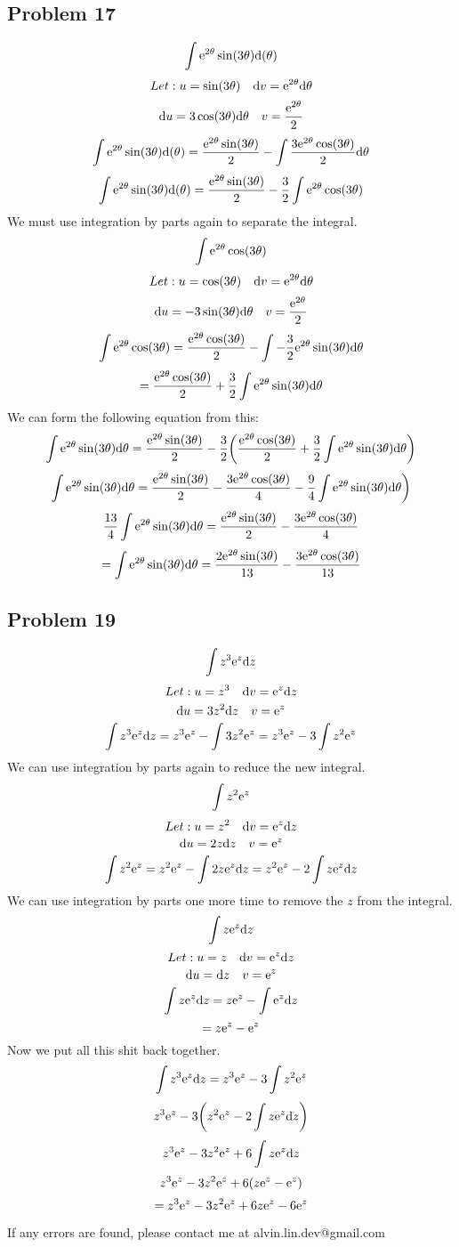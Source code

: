\documentclass[letterpaper, 12pt]{math}
\begin{document}
\subsection*{Problem 17}
\[ \int{\mathrm{e}^{2\theta}\sin(3\theta)}\mathrm{d}(\theta) \]
\[ Let: u = \sin(3\theta) \quad \mathrm{d}{v} = \mathrm{e}^{2\theta}\mathrm{d}{\theta} \]
\[ \mathrm{d}{u} = 3\cos(3\theta)\mathrm{d}{\theta} \quad v = \frac{\mathrm{e}^{2\theta}}{2} \]
\[ \int{\mathrm{e}^{2\theta}\sin(3\theta)}\mathrm{d}(\theta) =
   \frac{\mathrm{e}^{2\theta}\sin(3\theta)}{2}-
   \int{\frac{3\mathrm{e}^{2\theta}\cos(3\theta)}{2}\mathrm{d}{\theta}} \]
\[ \int{\mathrm{e}^{2\theta}\sin(3\theta)}\mathrm{d}(\theta) =
   \frac{\mathrm{e}^{2\theta}\sin(3\theta)}{2}-
   \frac{3}{2}\int{\mathrm{e}^{2\theta}\cos(3\theta)} \]
We must use integration by parts again to separate the integral.
\[ \int{\mathrm{e}^{2\theta}\cos(3\theta)} \]
\[ Let: u = \cos(3\theta) \quad \mathrm{d}{v} = \mathrm{e}^{2\theta}\mathrm{d}{\theta} \]
\[ \mathrm{d}{u} = -3\sin(3\theta)\mathrm{d}{\theta} \quad v = \frac{\mathrm{e}^{2\theta}}{2} \]
\[ \int{\mathrm{e}^{2\theta}\cos(3\theta)} =
   \frac{\mathrm{e}^{2\theta}\cos(3\theta)}{2}-
   \int{-\frac{3}{2}\mathrm{e}^{2\theta}\sin(3\theta)\mathrm{d}{\theta}} \]
\[ = \frac{\mathrm{e}^{2\theta}\cos(3\theta)}{2}+\frac{3}{2}
   \int{\mathrm{e}^{2\theta}\sin(3\theta)\mathrm{d}{\theta}} \]
We can form the following equation from this:
\[ \int{\mathrm{e}^{2\theta}\sin(3\theta)\mathrm{d}{\theta}} =
   \frac{\mathrm{e}^{2\theta}\sin(3\theta)}{2}-
   \frac{3}{2}\bigg(\frac{\mathrm{e}^{2\theta}\cos(3\theta)}{2}+
   \frac{3}{2}\int{\mathrm{e}^{2\theta}\sin(3\theta)\mathrm{d}{\theta}}\bigg) \]
\[ \int{\mathrm{e}^{2\theta}\sin(3\theta)\mathrm{d}{\theta}} =
   \frac{\mathrm{e}^{2\theta}\sin(3\theta)}{2}-
   \frac{3\mathrm{e}^{2\theta}\cos(3\theta)}{4}-
   \frac{9}{4}\int{\mathrm{e}^{2\theta}\sin(3\theta)\mathrm{d}{\theta}}\bigg) \]
\[ \frac{13}{4}\int{\mathrm{e}^{2\theta}\sin(3\theta)\mathrm{d}{\theta}} =
   \frac{\mathrm{e}^{2\theta}\sin(3\theta)}{2}-
   \frac{3\mathrm{e}^{2\theta}\cos(3\theta)}{4} \]
\[ = \int{\mathrm{e}^{2\theta}\sin(3\theta)\mathrm{d}{\theta}} =
\frac{2\mathrm{e}^{2\theta}\sin(3\theta)}{13}-
\frac{3\mathrm{e}^{2\theta}\cos(3\theta)}{13} \]

\subsection*{Problem 19}
\[ \int{z^{3}\mathrm{e}^{z}\mathrm{d}{z}} \]
\[ Let: u = z^{3} \quad \mathrm{d}{v} = \mathrm{e}^{z}\mathrm{d}{z} \]
\[ \mathrm{d}{u} = 3z^{2}\mathrm{d}{z} \quad v = \mathrm{e}^{z} \]
\[ \int{z^{3}\mathrm{e}^{z}\mathrm{d}{z}} =
   z^{3}\mathrm{e}^{z}-\int{3z^{2}\mathrm{e}^{z}} =
   z^{3}\mathrm{e}^{z}-3\int{z^{2}\mathrm{e}^{z}} \]
We can use integration by parts again to reduce the new integral.
\[ \int{z^{2}\mathrm{e}^{z}} \]
\[ Let: u = z^{2} \quad \mathrm{d}{v} = \mathrm{e}^{z}\mathrm{d}{z} \]
\[ \mathrm{d}{u} = 2z\mathrm{d}{z} \quad v = \mathrm{e}^{z} \]
\[ \int{z^{2}\mathrm{e}^{z}} = z^{2}\mathrm{e}^{z}-\int{2z\mathrm{e}^{z}\mathrm{d}{z}} =
   z^{2}\mathrm{e}^{z}-2\int{z\mathrm{e}^{z}\mathrm{d}{z}} \]
We can use integration by parts one more time to remove the \( z \) from the
integral.
\[ \int{z\mathrm{e}^{z}\mathrm{d}{z}} \]
\[ Let: u = z \quad \mathrm{d}{v} = \mathrm{e}^{z}\mathrm{d}{z} \]
\[ \mathrm{d}{u} = \mathrm{d}{z} \quad v = \mathrm{e}^{z} \]
\[ \int{z\mathrm{e}^{z}\mathrm{d}{z}} = z\mathrm{e}^{z}-\int{\mathrm{e}^{z}\mathrm{d}{z}} \]
\[ = z\mathrm{e}^{z}-\mathrm{e}^{z} \]
Now we put all this shit back together.
\[ \int{z^{3}\mathrm{e}^{z}\mathrm{d}{z}} =
   z^{3}\mathrm{e}^{z}-3\int{z^{2}\mathrm{e}^{z}} \]
\[ z^{3}\mathrm{e}^{z}-3\bigg(z^{2}\mathrm{e}^{z}-2\int{z\mathrm{e}^{z}\mathrm{d}{z}}\bigg) \]
\[ z^{3}\mathrm{e}^{z}-3z^{2}\mathrm{e}^{z}+6\int{z\mathrm{e}^{z}\mathrm{d}{z}} \]
\[ z^{3}\mathrm{e}^{z}-3z^{2}\mathrm{e}^{z}+6(z\mathrm{e}^{z}-\mathrm{e}^{z}) \]
\[ = z^{3}\mathrm{e}^{z}-3z^{2}\mathrm{e}^{z}+6z\mathrm{e}^{z}-6\mathrm{e}^{z} \]

\begin{center}
  If any errors are found, please contact me at alvin.lin.dev@gmail.com
\end{center}
\end{document}
